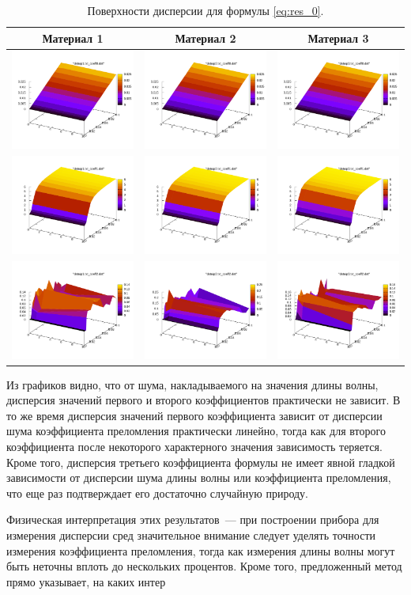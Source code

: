 \documentclass[12pt,a4paper]{article}
\theoremstyle{definition}
\begin{document}
\begin{table}[h]
  \centering
  \begin{tabular}{c c c}
	Материал 1 & Материал 2 & Материал 3 \\ \hline
	\includegraphics[scale=0.25]{figs/even/p1.txt_coeff0.dat.pdf} & \includegraphics[scale=0.25]{figs/even/p2.txt_coeff0.dat.pdf} & \includegraphics[scale=0.2]{figs/even/p3.txt_coeff0.dat.pdf} \\
	\includegraphics[scale=0.25]{figs/even/p1.txt_coeff1.dat.pdf} & \includegraphics[scale=0.25]{figs/even/p2.txt_coeff1.dat.pdf} & \includegraphics[scale=0.25]{figs/even/p3.txt_coeff1.dat.pdf} \\
	\includegraphics[scale=0.25]{figs/even/p1.txt_coeff2.dat.pdf} & \includegraphics[scale=0.25]{figs/even/p2.txt_coeff2.dat.pdf} & \includegraphics[scale=0.25]{figs/even/p3.txt_coeff2.dat.pdf}
  \end{tabular}
  \caption{Поверхности дисперсии для формулы \eqref{eq:res_0}.}
  \label{tabl:res_even}
\end{table}

Из графиков видно, что от шума, накладываемого на значения длины волны, дисперсия значений
первого и второго коэффициентов практически не зависит. В то же время дисперсия значений
первого коэффициента зависит от дисперсии шума коэффициента преломления практически линейно,
тогда как для второго коэффициента после некоторого характерного значения зависимость теряется.
Кроме того, дисперсия третьего коэффициента формулы не имеет явной гладкой зависимости от
дисперсии шума длины волны или коэффициента преломления, что еще раз подтверждает его достаточно
случайную природу.

Физическая интерпретация этих результатов~--- при построении прибора для измерения дисперсии
сред значительное внимание следует уделять точности измерения коэффициента преломления,
тогда как измерения длины волны могут быть неточны вплоть до нескольких процентов. Кроме того,
предложенный метод прямо указывает, на каких интер
\end{document}
